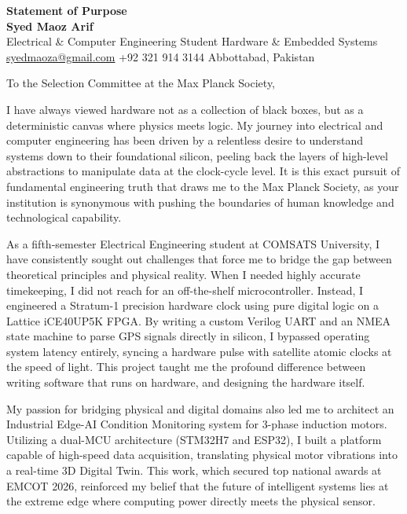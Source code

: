 \documentclass[11pt,a4paper]{article}
\begin{document}
\thispagestyle{empty}

\begin{center}
    {\Large \textbf{Statement of Purpose}}\\[10pt]
    {\large \textbf{Syed Maoz Arif}}\\[5pt]
    Electrical \& Computer Engineering Student \textbar{} Hardware \& Embedded Systems\\[3pt]
    \href{mailto:syedmaoza@gmail.com}{syedmaoza@gmail.com} \textbar{} +92 321 914 3144 \textbar{} Abbottabad, Pakistan
\end{center}

\vspace{20pt}

\noindent To the Selection Committee at the Max Planck Society,

\vspace{10pt}
\onehalfspacing

\noindent I have always viewed hardware not as a collection of black boxes, but as a deterministic canvas where physics meets logic. My journey into electrical and computer engineering has been driven by a relentless desire to understand systems down to their foundational silicon, peeling back the layers of high-level abstractions to manipulate data at the clock-cycle level. It is this exact pursuit of fundamental engineering truth that draws me to the Max Planck Society, as your institution is synonymous with pushing the boundaries of human knowledge and technological capability.

\vspace{10pt}

\noindent As a fifth-semester Electrical Engineering student at COMSATS University, I have consistently sought out challenges that force me to bridge the gap between theoretical principles and physical reality. When I needed highly accurate timekeeping, I did not reach for an off-the-shelf microcontroller. Instead, I engineered a Stratum-1 precision hardware clock using pure digital logic on a Lattice iCE40UP5K FPGA. By writing a custom Verilog UART and an NMEA state machine to parse GPS signals directly in silicon, I bypassed operating system latency entirely, syncing a hardware pulse with satellite atomic clocks at the speed of light. This project taught me the profound difference between writing software that runs on hardware, and designing the hardware itself.

\vspace{10pt}

\noindent My passion for bridging physical and digital domains also led me to architect an Industrial Edge-AI Condition Monitoring system for 3-phase induction motors. Utilizing a dual-MCU architecture (STM32H7 and ESP32), I built a platform capable of high-speed data acquisition, translating physical motor vibrations into a real-time 3D Digital Twin. This work, which secured top national awards at EMCOT 2026, reinforced my belief that the future of intelligent systems lies at the extreme edge where computing power directly meets the physical sensor.
\end{document}

